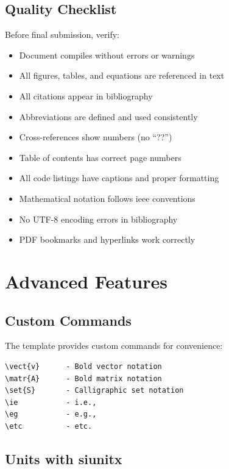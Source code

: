 \subsection*{Quality Checklist}

Before final submission, verify:

\begin{itemize}
    \item[$\square$] Document compiles without errors or warnings
    \item[$\square$] All figures, tables, and equations are referenced in text
    \item[$\square$] All citations appear in bibliography
    \item[$\square$] Abbreviations are defined and used consistently
    \item[$\square$] Cross-references show numbers (no ``??'')
    \item[$\square$] Table of contents has correct page numbers
    \item[$\square$] All code listings have captions and proper formatting
    \item[$\square$] Mathematical notation follows \gls{ieee} conventions
    \item[$\square$] No UTF-8 encoding errors in bibliography
    \item[$\square$] PDF bookmarks and hyperlinks work correctly
\end{itemize}

\section*{Advanced Features}

\subsection*{Custom Commands}

The template provides custom commands for convenience:

\begin{verbatim}
\vect{v}      - Bold vector notation
\matr{A}      - Bold matrix notation
\set{S}       - Calligraphic set notation
\ie           - i.e.,
\eg           - e.g.,
\etc          - etc.
\end{verbatim}

\subsection*{Units with siunitx}

